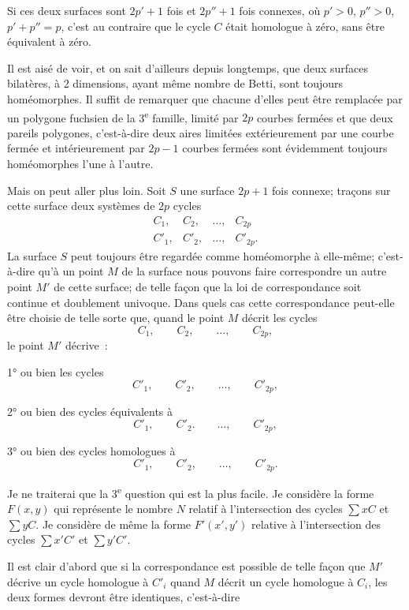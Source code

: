 \documentclass{article}
\begin{document}
Si ces deux surfaces sont $2p' + 1$ fois et $2p'' + 1$ fois connexes, où $p' > 0$, $p'' > 0$, $p' + p'' = p$, c'est au contraire que le cycle $C$ était homologue à zéro, sans être équivalent à zéro.

Il est aisé de voir, et on sait d'ailleurs depuis longtemps, que deux surfaces bilatères, à 2 dimensions, ayant même nombre de Betti, sont toujours homéomorphes. Il suffit de remarquer que chacune d'elles peut être remplacée par un polygone fuchsien de la 3\textsuperscript{e} famille, limité par $2p$ courbes fermées et que deux pareils polygones, c'est-à-dire deux aires limitées extérieurement par une courbe fermée et intérieurement par $2p - 1$ courbes fermées sont évidemment toujours homéomorphes l'une à l'autre.

Mais on peut aller plus loin. Soit $S$ une surface $2p + 1$ fois connexe; traçons sur cette surface deux systèmes de $2p$ cycles
\[ \begin{matrix} C_{1}, & C_{2}, & \ldots, & C_{2p} \\[1ex] C'_{1}, & C'_{2}, & \ldots, & C'_{2p}. \end{matrix} \]
La surface $S$ peut toujours être regardée comme homéomorphe à elle-même; c'est-à-dire qu'à un point $M$ de la surface nous pouvons faire correspondre un autre point $M'$ de cette surface; de telle façon que la loi de correspondance soit continue et doublement univoque. Dans quels cas cette correspondance peut-elle être choisie de telle sorte que, quand le point $M$ décrit les cycles
\[ C_{1}, \qquad C_{2}, \qquad \ldots, \qquad C_{2p}, \]
le point $M'$ décrive~:

1° ou bien les cycles
\[ C'_{1}, \qquad C'_{2}, \qquad \ldots, \qquad C'_{2p}, \]

2° ou bien des cycles équivalents à
\[ C'_{1}, \qquad C'_{2}. \qquad \ldots, \qquad C'_{2p}, \]

3° ou bien des cycles homologues à
\[ C'_{1}, \qquad C'_{2}, \qquad \ldots, \qquad C'_{2p}. \]

Je ne traiterai que la 3\textsuperscript{e} question qui est la plus facile. Je considère la forme $F(x, y)$ qui représente le nombre $N$ relatif à l'intersection des cycles $\displaystyle\sum x C$ et $\displaystyle\sum y C$. Je considère de même la forme $F'(x', y')$ relative à l'intersection des cycles $\displaystyle\sum x' C'$ et $\displaystyle\sum y' C'$.

Il est clair d'abord que si la correspondance est possible de telle façon que $M'$ décrive un cycle homologue à $C'_{i}$ quand $M$ décrit un cycle homologue à $C_{i}$, les deux formes devront être identiques, c'est-à-dire
\end{document}
